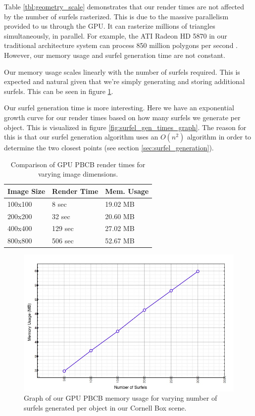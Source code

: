 Table \ref{tbl:geometry_scale} demonstrates that our render times are not affected by the number of surfels rasterized. This is due to the massive parallelism provided to us through the GPU. It can rasterize millions of triangles simultaneously, in parallel. For example, the ATI Radeon HD 5870 in our traditional architecture system can process 850 million polygons per second \cite{bib:ati5870}. However, our memory usage and surfel generation time are not constant.

Our memory usage scales linearly with the number of surfels required. This is expected and natural given that we’re simply generating and storing additional surfels. This can be seen in figure \ref{fig:surfel_memusg}.

Our surfel generation time is more interesting. Here we have an exponential growth curve for our render times based on how many surfels we generate per object. This is visualized in figure \ref{fig:surfel_gen_times_graph}. The reason for this is that our surfel generation algorithm uses an $O(n^{2})$ algorithm in order to determine the two closest points (see section \ref{sec:surfel_generation}).

\begin{table}[h!]
   \centering
   \begin{tabular}{ | l | l | l | }
   \hline
   \textbf{Image Size} & \textbf{Render Time} & \textbf{Mem. Usage} \\ \hline
   100x100 & 8 sec & 19.02 MB \\ \hline
   200x200 & 32 sec & 20.60 MB \\ \hline
   400x400 & 129 sec & 27.02 MB \\ \hline
   800x800 & 506 sec & 52.67 MB\\ \hline
   \end{tabular}
   \captionfonts
   \caption[Scalability: Image Size]{Comparison of GPU PBCB render times for varying image dimensions.}
   \label{tbl:img_scale}
\end{table}

\begin{figure}[h!]
    \centering
    \includegraphics[width=150mm]{../img/surfel_memusg.png}
    \caption[Surfel Memory Usage Graph]{Graph of our GPU PBCB memory usage for varying number of surfels generated per object in our Cornell Box scene.}
    \label{fig:surfel_memusg}
\end{figure}

